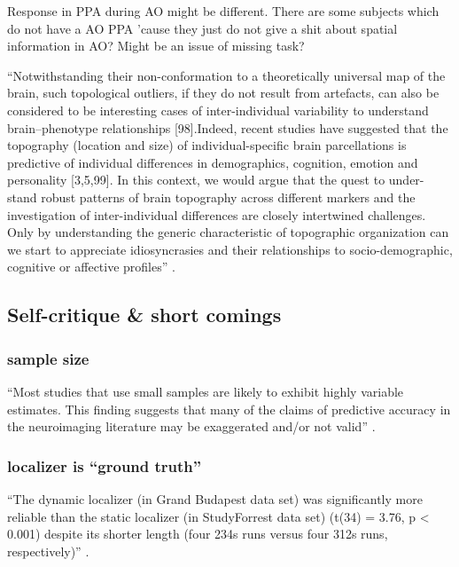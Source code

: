 %
Response in PPA during AO might be different.
%
There are some subjects which do not have a AO PPA 'cause they just do not give
a shit about spatial information in AO? Might be an issue of missing task?


``Notwithstanding their non-conformation to a theoretically universal map of the
brain, such topological outliers, if they do not result from artefacts, can also
be considered to be interesting cases of inter-individual variability to
understand brain–phenotype relationships [98].Indeed, recent studies have
suggested that the topography (location and size) of individual-specific brain
parcellations is predictive of individual differences in demographics,
cognition, emotion and personality [3,5,99]. In this context, we would argue
that the quest to under- stand robust patterns of brain topography across
different markers and the investigation of inter-individual differences are
closely intertwined challenges. Only by understanding the generic characteristic
of topographic organization can we start to appreciate idiosyncrasies and their
relationships to socio-demographic, cognitive or affective profiles''
\citep{eickhoff2018imaging}.

\subsection{Self-critique \& short comings}


\subsubsection{sample size}

``Most studies that use small samples are likely to exhibit highly variable
estimates. This finding suggests that many of the claims of predictive accuracy
in the neuroimaging literature may be exaggerated and/or not valid''
\citep{poldrack2019establishment}.


\subsubsection{localizer is ``ground truth''}

%
``The dynamic localizer (in Grand Budapest data set) was significantly more
reliable than the static localizer (in StudyForrest data set) (t(34) = 3.76, p <
0.001) despite its shorter length (four 234s runs versus four 312s runs,
respectively)'' \citep{jiahui2020predicting}.

